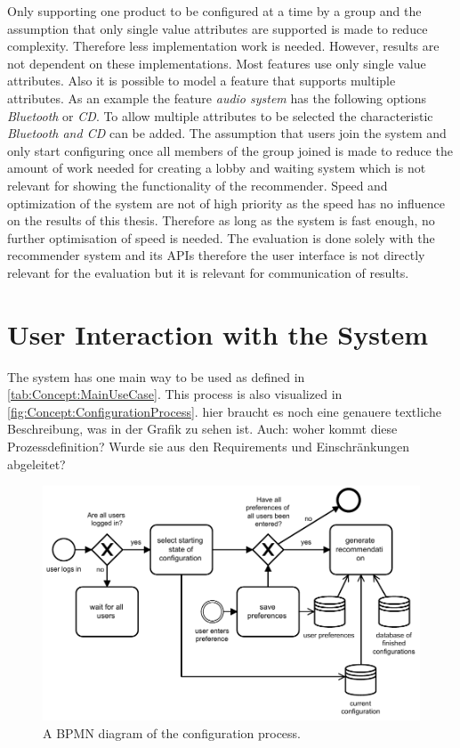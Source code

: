 Only supporting one product to be configured at a time by a group and the assumption that only single value attributes are supported is made to reduce complexity. Therefore less implementation work is needed. However, results are not dependent on these implementations. Most features use only single value attributes. Also it is possible to model a feature that supports multiple attributes. As an example the feature \emph{audio system} has the following options \emph{Bluetooth} or \emph{CD}. To allow multiple attributes to be selected the characteristic \emph{Bluetooth and CD} can be added.
The assumption that users join the system and only start configuring once all members of the group joined is made to reduce the amount of work needed for creating a lobby and waiting system which is not relevant for showing the functionality of the recommender. Speed and optimization of the system are not of high priority as the speed has no influence on the results of this thesis. Therefore as long as the system is fast enough, no further optimisation of speed is needed.
The evaluation is done solely with the recommender system and its APIs therefore the user interface is not directly relevant for the evaluation but it is relevant for communication of results.

\section{User Interaction with the System}
\label{sec:Concept:UserSystemInteraction}

The system has one main way to be used as defined in \autoref{tab:Concept:MainUseCase}. This process is also visualized in \autoref{fig:Concept:ConfigurationProcess}.
hier braucht es noch eine genauere textliche Beschreibung, was in der Grafik zu sehen ist. Auch: woher kommt diese Prozessdefinition? Wurde sie aus den Requirements und Einschränkungen abgeleitet?

\begin{figure}
    \centering
    \includegraphics[width=1\textwidth]{./figures/40_concept/bpmn_configuration_process_with_continious_recommendation.pdf}
    \caption{A BPMN diagram of the configuration process.}
    \label{fig:Concept:ConfigurationProcess}
\end{figure}

